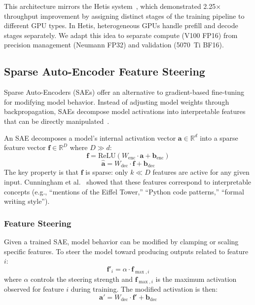 \documentclass[11pt,letterpaper]{article}
\theoremstyle{definition}
\begin{document}
This architecture mirrors the Hetis system~\cite{hetis2024}, which demonstrated 2.25$\times$ throughput improvement by assigning distinct stages of the training pipeline to different GPU types. In Hetis, heterogeneous GPUs handle prefill and decode stages separately. We adapt this idea to separate compute (V100 FP16) from precision management (Neumann FP32) and validation (5070~Ti BF16).

\subsection{Sparse Auto-Encoder Feature Steering}
\label{sec:sae}

Sparse Auto-Encoders (SAEs) offer an alternative to gradient-based fine-tuning for modifying model behavior. Instead of adjusting model weights through backpropagation, SAEs decompose model activations into interpretable features that can be directly manipulated~\cite{cunningham2023sae}.

An SAE decomposes a model's internal activation vector $\mathbf{a} \in \mathbb{R}^d$ into a sparse feature vector $\mathbf{f} \in \mathbb{R}^D$ where $D \gg d$:
\begin{equation}
    \mathbf{f} = \text{ReLU}(W_{\text{enc}} \cdot \mathbf{a} + \mathbf{b}_{\text{enc}})
\end{equation}
\begin{equation}
    \hat{\mathbf{a}} = W_{\text{dec}} \cdot \mathbf{f} + \mathbf{b}_{\text{dec}}
\end{equation}
The key property is that $\mathbf{f}$ is sparse: only $k \ll D$ features are active for any given input. Cunningham et al.~\cite{cunningham2023sae} showed that these features correspond to interpretable concepts (e.g., ``mentions of the Eiffel Tower,'' ``Python code patterns,'' ``formal writing style'').

\subsubsection{Feature Steering}

Given a trained SAE, model behavior can be modified by clamping or scaling specific features. To steer the model toward producing outputs related to feature $i$:
\begin{equation}
    \mathbf{f}'_i = \alpha \cdot \mathbf{f}_{\max,i}
\end{equation}
where $\alpha$ controls the steering strength and $\mathbf{f}_{\max,i}$ is the maximum activation observed for feature $i$ during training. The modified activation is then:
\begin{equation}
    \mathbf{a}' = W_{\text{dec}} \cdot \mathbf{f}' + \mathbf{b}_{\text{dec}}
\end{equation}
\end{document}
